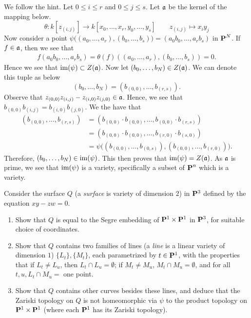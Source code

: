 \documentclass[10pt]{amsart}
\begin{document}
\begin{solution}
\begin{luke}
    We follow the hint. Let $0 \le i \le r$ and $0 \le j \le s$. 
    Let $\mathfrak{a}$ be the kernel of the mapping below.
    \[
        \theta: k[z_{(i,j)}] \to k[x_0, \dots, x_r, y_0, \dots, y_s] \qquad z_{(i,j)} \mapsto x_iy_j
    \]
    Now consider a point $\psi\big( (a_0, \dots, a_r), (b_0, \dots, b_s) \big) = (a_0b_0, \dots, a_rb_s)$ 
    in $\operatorname{\mathbf{P}}^N$. If $f \in \mathfrak{a}$, then we see that 
    \begin{align*}
        f(a_0b_0, \dots, a_rb_s)
        =
        \theta(f)((a_0, \dots, a_r), (b_0, \dots, b_s)) =0.
    \end{align*}
    Hence we see that $\operatorname{im}(\psi) \subset Z(\mathfrak{a})$. 
    Now let $(b_0, \dots, b_N) \in Z(\mathfrak{a})$. We can denote this tuple 
    as below
    \[
        (b_0, \dots, b_N) = (b_{(0,0)}, \dots, b_{(r,s)}).
    \]
    Observe that $z_{(0,0)}z_{(i,j)} - z_{(i, 0)}z_{(j,0)} \in \mathfrak{a}$.
    Hence, we see that $b_{(0,0)}b_{(i,j)} = b_{(i, 0)}b_{(j,0)}$. 
    We the have that
    \begin{align*}
        (b_{(0,0)}, \dots, b_{(r,s)}) 
        &= 
        (b_{(0,0)}\cdot b_{(0,0)}, \dots, b_{(0,0)} \cdot b_{(r,s)})\\
        &=
        (b_{(0, 0)}\cdot b_{(0,0)}, \dots, b_{(r, 0)}\cdot b_{(s,0)})\\
        &=
        \psi\big((b_{(0,0)}, \dots, b_{(0,s)}), (b_{(0,0)}, \dots, b_{(r,0)}) \big).
    \end{align*}
    Therefore, $(b_0, \dots, b_N) \in \operatorname{im}(\psi)$. This then proves that 
    $\operatorname{im}(\psi) = Z(\mathfrak{a})$. As $\mathfrak{a}$ is prime, we see that $\operatorname{im}(\psi)$ 
    is a variety, specifically a subset of $\operatorname{\mathbf{P}}^n$ which is a variety. 

\end{luke}
\end{solution}

\begin{exercise}[2.15]
    Consider the surface $Q$ (a \emph{surface} is variety of dimension $2$) in
    ${\bf P}^3$ defined by the equation $xy-zw = 0$.
    \begin{enumerate} 
      \item Show that $Q$ is equal to the Segre embedding of ${\bf P}^1 \times {\bf P}^1$ in
        ${\bf P}^3$, for suitable choice of coordinates.
      \item Show that $Q$ contains two families of lines (a \emph{line} is a
        linear variety of dimension $1$) $\{L_t\}, \{M_t\}$, each parametrized by
        $t \in {\bf P}^1$, with the properties that if $L_t \ne L_u$, then
        $L_t \cap L_u = \emptyset$; if $M_t \ne M_u$, $M_t \cap M_u = \emptyset$,
        and for all $t,u, L_t \cap M_u =$ one point. 
      \item Show that $Q$ contains other curves besides these lines, and deduce that
        the Zariski topology on $Q$ is not homeomorphic via $\psi$ to the product
        topology on ${\bf P}^1 \times {\bf P}^1$ (where each ${\bf P}^1$ has its Zariski
        topology). 
    \end{enumerate}
\end{exercise}
\end{document}

